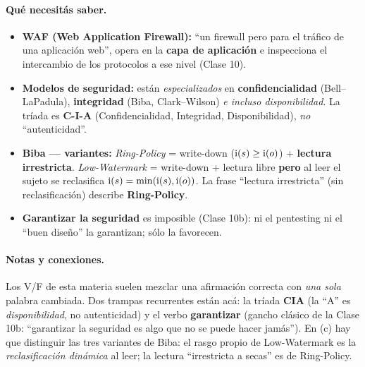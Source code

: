 \paragraph{Qué necesitás saber.}
\begin{itemize}
  \item \textbf{WAF (Web Application Firewall):} ``un firewall pero para el tráfico de una
        aplicación web'', opera en la \textbf{capa de aplicación} e inspecciona el
        intercambio de los protocolos a ese nivel (Clase 10).
  \item \textbf{Modelos de seguridad:} están \emph{especializados} en
        \textbf{confidencialidad} (Bell--LaPadula), \textbf{integridad} (Biba, Clark--Wilson)
        \emph{e incluso disponibilidad}. La tríada es \textbf{C-I-A}
        (Confidencialidad, Integridad, Disponibilidad), \emph{no} ``autenticidad''.
  \item \textbf{Biba — variantes:} \emph{Ring-Policy} = write-down ($\mathrm{i}(s)\ge\mathrm{i}(o)$) +
        \textbf{lectura irrestricta}. \emph{Low-Watermark} = write-down + lectura libre
        \textbf{pero} al leer el sujeto se reclasifica $\mathrm{i}(s)=\min(\mathrm{i}(s),\mathrm{i}(o))$. La frase
        ``lectura irrestricta'' (sin reclasificación) describe \textbf{Ring-Policy}.
  \item \textbf{Garantizar la seguridad} es imposible (Clase 10b): ni el pentesting ni el
        ``buen diseño'' la garantizan; sólo la favorecen.
\end{itemize}

\paragraph{Notas y conexiones.}
Los V/F de esta materia suelen mezclar una afirmación correcta con \emph{una sola} palabra
cambiada. Dos trampas recurrentes están acá: la tríada \textbf{CIA} (la ``A'' es
\emph{disponibilidad}, no autenticidad) y el verbo \textbf{garantizar} (gancho clásico de la
Clase 10b: ``garantizar la seguridad es algo que no se puede hacer jamás''). En (c) hay que
distinguir las tres variantes de Biba: el rasgo propio de Low-Watermark es la
\emph{reclasificación dinámica} al leer; la lectura ``irrestricta a secas'' es de Ring-Policy.

